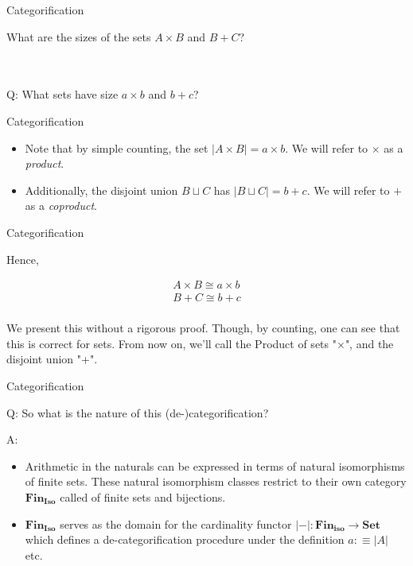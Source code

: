 \documentclass[tikz]{beamer}
\theoremstyle{definition}
\begin{document}
\begin{frame}{Categorification}

What are the sizes of the sets $A \times B$ and $B + C$?

\\
\\
Q: What sets have size $a \times b$ and $b + c$?

\end{frame}{}

\begin{frame}{Categorification}
    \begin{itemize}
        \item Note that by simple counting, the set $|A \times B| = a \times b$. We will refer to $\times$ as a \textit{product}.
        \item Additionally, the disjoint union $B \sqcup C$ has $|B \sqcup C| = b + c$. We will refer to $+$ as a \textit{coproduct}. 
    \end{itemize}
\end{frame}{}

\begin{frame}{Categorification}

Hence, 

\begin{block}{}
\begin{gather*}
    A \times B \cong a \times b \\
    B + C \cong b + c
    \\
\end{gather*}
\end{block}

We present this without a rigorous proof. Though, by counting, one can see that this is correct for sets. From now on, we'll call the Product of sets "$\times$", and the disjoint union "+".
    
\end{frame}

\begin{frame}{Categorification}

\begin{block}{}
    Q: So what is the nature of this (de-)categorification? 

    A: \begin{itemize}
        \item Arithmetic in the naturals can be expressed in terms of natural isomorphisms of finite sets. These  natural isomorphism classes restrict to their own category $\mathbf{Fin_{Iso}}$ called of finite sets and bijections. 
        \item $\mathbf{Fin_{Iso}}$ serves as the domain for the cardinality functor $|-|: \mathbf{Fin_{iso}} \to \mathbf{Set}$ which defines  a de-categorification procedure under the definition $a :\equiv |A|$ etc.
    \end{itemize}{}
\end{block}

\end{frame}{}
\end{document}
